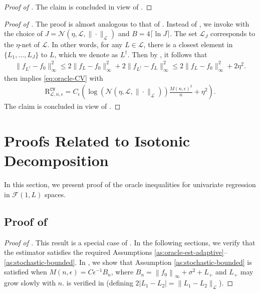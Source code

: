 \documentclass[12pt]{article}
\begin{document}
\begin{appendices}
\begin{proof}[Proof of ]
The claim is concluded in view of .
\end{proof}
\begin{proof}[Proof of ]
    The proof is almost analogous to that of . Instead of , we invoke  with the choice of $J = \mathcal{N}\left(\eta, \mathcal{L}, \|\cdot\|_{\mathcal{L}}\right)$ and $B = 4 \lceil \ln J \rceil$. The set $\mathcal{L}_J$ corresponds to the $\eta$-net of $\mathcal{L}$. In other words, for any $L \in \mathcal{L}$, there is a closest element in $\{L_1, \ldots, L_J\}$ to $L$, which we denote as $L^\dag$. Then by , it follows that
    \begin{align*}
        \|f_{L^\dag} - f_0\|_\infty^2 \le 2\|f_{L} - f_0\|_\infty^2 + 2\|f_{L^\dag} - f_{L}\|_\infty^2 \le 2\|f_{L} - f_0\|_\infty^2 + 2\eta^2.
    \end{align*}
     then implies \eqref{eq:oracle-CV} with 
    \begin{align*}
    \mathrm{R}_{\mathcal{L}, n, \epsilon}^{\mathtt{CV}} = C_\epsilon \left(\log \left(\mathcal{N}\left(\eta, \mathcal{L}, \|\cdot\|_{\mathcal{L}}\right)\right)\frac{M(n,\epsilon)^2}{n} + \eta^2\right).
\end{align*}
The claim is concluded in view of .
\end{proof}


\newpage
\section{Proofs Related to Isotonic Decomposition}\label{app: proof of isotonic regression using new structure}

In this section, we present proof of the oracle inequalities for univariate regression in $\mathcal{F}(1,L)$ spaces.

\subsection{Proof of }\label{app: general_isotonic_proof}

\begin{proof}[Proof of ]
This result is a special case of . In the following sections, we verify that the estimator satisfies the required Assumptions \ref{as:oracle-est-adaptive}--\ref{as:stochastic-bounded}. In , we show that Assumption \ref{as:stochastic-bounded} is satisfied when $M(n,\epsilon) = C\epsilon^{-1}B_n$, where $B_n = \left\|f_0\right\|_{\infty}+\sigma^2+L_+$ and $L_+$ may grow slowly with $n$.  is verified in  (defining $2|L_1 - L_2| = \|L_1 - L_2\|_{\mathcal{L}}$). 


\end{proof}
\end{appendices}
\end{document}
